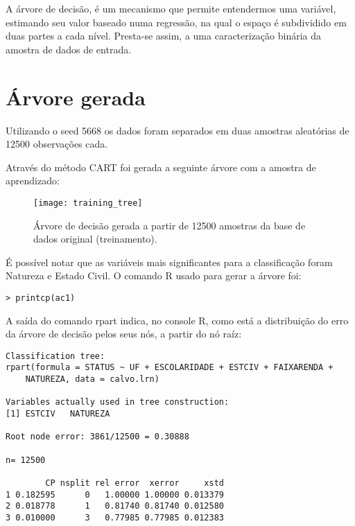 \label{chap:DecisionTree}A árvore de decisão, é um mecanismo que permite entendermos uma variável,
estimando seu valor baseado numa regressão, na qual o espaço é subdividido
em duas partes a cada nível. Presta-se assim, a uma caracterização
binária da amostra de dados de entrada.


\section{Árvore gerada}

Utilizando o seed 5668 os dados foram separados em duas amostras aleatórias
de 12500 observações cada.

Através do método CART foi gerada a seguinte árvore com a amostra
de aprendizado:

\begin{center}
\begin{figure}[h]
\begin{centering}
\texttt{[image: training\_tree]}
\par\end{centering}
\caption{\label{fig:TrainingTree}Árvore de decisão gerada a partir de 12500 amostras da base de dados original (treinamento).}
\end{figure}
\vspace*{-40pt}
\par\end{center}

É possível notar que as variáveis mais significantes para a classificação
foram Natureza e Estado Civil. O comando R usado para gerar a árvore foi:

\begin{verbatim}
> printcp(ac1)
\end{verbatim}


A saída do comando rpart indica, no console R, como está a distribuição do erro da árvore de decisão pelos seus nós, a partir do nó raíz:

\begin{lstlisting}
Classification tree:
rpart(formula = STATUS ~ UF + ESCOLARIDADE + ESTCIV + FAIXARENDA + 
    NATUREZA, data = calvo.lrn)
 
Variables actually used in tree construction:
[1] ESTCIV   NATUREZA
 
Root node error: 3861/12500 = 0.30888
 
n= 12500 
 
        CP nsplit rel error  xerror     xstd
1 0.182595      0   1.00000 1.00000 0.013379
2 0.018778      1   0.81740 0.81740 0.012580
3 0.010000      3   0.77985 0.77985 0.012383
\end{lstlisting}


